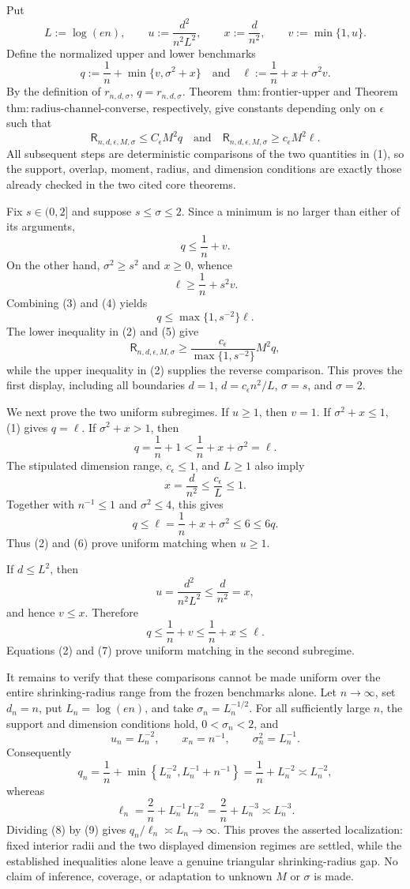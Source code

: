 Put
\[
 L:=\log(en),\qquad
 u:=\frac{d^2}{n^2L^2},\qquad
 x:=\frac d{n^2},\qquad
 v:=\min\{1,u\}.
\]
Define the normalized upper and lower benchmarks
\[
 q:=\frac1n+\min\{v,\sigma^2+x\}
 \quad\text{and}\quad
 \ell:=\frac1n+x+\sigma^2v.
\tag{1}
\]
By the definition of \(r_{n,d,\sigma}\), \(q=r_{n,d,\sigma}\).  Theorem~\(\mathrm{thm:frontier\text{-}upper}\) and Theorem~\(\mathrm{thm:radius\text{-}channel\text{-}converse}\), respectively, give constants depending only on \(\epsilon\) such that
\[
 \mathsf R_{n,d,\epsilon,M,\sigma}\le C_{\epsilon}M^2q
 \quad\text{and}\quad
 \mathsf R_{n,d,\epsilon,M,\sigma}\ge c_{\epsilon}M^2\ell.
\tag{2}
\]
All subsequent steps are deterministic comparisons of the two quantities in (1), so the support, overlap, moment, radius, and dimension conditions are exactly those already checked in the two cited core theorems.

Fix \(s\in(0,2]\) and suppose \(s\le\sigma\le2\).  Since a minimum is no larger than either of its arguments,
\[
 q\le \frac1n+v.
\tag{3}
\]
On the other hand, \(\sigma^2\ge s^2\) and \(x\ge0\), whence
\[
 \ell\ge\frac1n+s^2v.
\tag{4}
\]
Combining (3) and (4) yields
\[
 q\le \max\{1,s^{-2}\}\ell.
\tag{5}
\]
The lower inequality in (2) and (5) give
\[
 \mathsf R_{n,d,\epsilon,M,\sigma}
 \ge \frac{c_{\epsilon}}{\max\{1,s^{-2}\}}M^2q,
\]
while the upper inequality in (2) supplies the reverse comparison.  This proves the first display, including all boundaries \(d=1\), \(d=c_{\epsilon}n^2/L\), \(\sigma=s\), and \(\sigma=2\).

We next prove the two uniform subregimes.  If \(u\ge1\), then \(v=1\).  If \(\sigma^2+x\le1\), (1) gives \(q=\ell\).  If \(\sigma^2+x>1\), then
\[
 q=\frac1n+1<\frac1n+x+\sigma^2=\ell.
\]
The stipulated dimension range, \(c_{\epsilon}\le1\), and \(L\ge1\) also imply
\[
 x=\frac d{n^2}\le\frac{c_{\epsilon}}L\le1.
\]
Together with \(n^{-1}\le1\) and \(\sigma^2\le4\), this gives
\[
 q\le\ell=\frac1n+x+\sigma^2\le6\le6q.
\tag{6}
\]
Thus (2) and (6) prove uniform matching when \(u\ge1\).

If \(d\le L^2\), then
\[
 u=\frac{d^2}{n^2L^2}\le\frac d{n^2}=x,
\]
and hence \(v\le x\).  Therefore
\[
 q\le\frac1n+v\le\frac1n+x\le\ell.
\tag{7}
\]
Equations (2) and (7) prove uniform matching in the second subregime.

It remains to verify that these comparisons cannot be made uniform over the entire shrinking-radius range from the frozen benchmarks alone.  Let \(n\to\infty\), set \(d_n=n\), put \(L_n=\log(en)\), and take \(\sigma_n=L_n^{-1/2}\).  For all sufficiently large \(n\), the support and dimension conditions hold, \(0<\sigma_n<2\), and
\[
 u_n=L_n^{-2},\qquad x_n=n^{-1},\qquad \sigma_n^2=L_n^{-1}.
\]
Consequently
\[
 q_n=\frac1n+\min\left\{L_n^{-2},L_n^{-1}+n^{-1}\right\}
 =\frac1n+L_n^{-2}\asymp L_n^{-2},
\tag{8}
\]
whereas
\[
 \ell_n=\frac2n+L_n^{-1}L_n^{-2}
 =\frac2n+L_n^{-3}\asymp L_n^{-3}.
\tag{9}
\]
Dividing (8) by (9) gives \(q_n/\ell_n\asymp L_n\to\infty\).  This proves the asserted localization: fixed interior radii and the two displayed dimension regimes are settled, while the established inequalities alone leave a genuine triangular shrinking-radius gap.  No claim of inference, coverage, or adaptation to unknown \(M\) or \(\sigma\) is made.